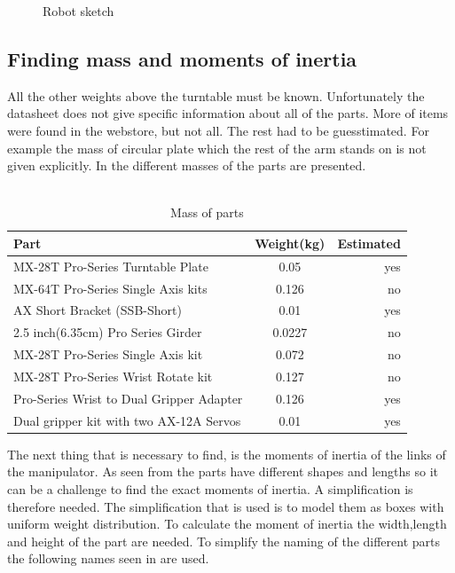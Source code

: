\begin{figure}[htbp]
  \centering
  
  \caption{Robot sketch}
  \label{fig:utgangspunkt}
\end{figure}



\subsection{Finding mass and moments of inertia}
All the other weights above the turntable must be known. Unfortunately the datasheet does not give specific information about all of the parts. More of items were found in the webstore, but not all. The rest had to be guesstimated. For example the mass of circular plate which the rest of the arm stands on is not given explicitly. In  the different masses of the parts are presented.\\\\ 
\begin{table}[htbp]
\centering
\caption{Mass of parts}
\label{table:partmass}
    \begin{tabular}{l c r}
        \toprule
        Part  &  Weight(kg) & Estimated\\
        \midrule
        MX-28T Pro-Series Turntable Plate& 0.05 & yes\\
        MX-64T Pro-Series Single Axis kits& 0.126 & no\\
        AX Short Bracket (SSB-Short) & 0.01 & yes\\
        2.5 inch(6.35cm) Pro Series Girder & 0.0227 & no\\
        MX-28T Pro-Series Single Axis kit & 0.072 & no \\
        MX-28T Pro-Series Wrist Rotate kit & 0.127 & no\\
        Pro-Series Wrist to Dual Gripper Adapter & 0.126 & yes\\
        Dual gripper kit with two AX-12A Servos& 0.01 & yes\\
        \bottomrule
    \end{tabular}
\end{table}
The next thing that is necessary to find, is the moments of inertia of the links of the manipulator. As seen from  the parts have different shapes and lengths so it can be a challenge to find the exact moments of inertia. A simplification is therefore needed. The simplification that is used is to model them as boxes with uniform weight distribution. To calculate the moment of inertia the width,length and height of the part are needed. To simplify the naming of the different parts the following names seen in  are used.\\


